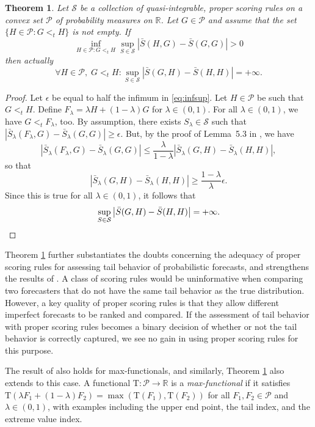 \documentclass[12pt]{article}
\newcommand{\R}{\mathbb{R}}
\newcommand{\Pp}{\mathcal{P}}
\newcommand{\Ss}{\mathcal{S}}
\newcommand{\1}{\mathbf{1}} %
\newtheorem{theorem}[propo]{Theorem}
\theoremstyle{definition}
\begin{document}
\begin{theorem}\label{thm:19}
Let $\Ss$ be a collection of quasi-integrable, proper scoring rules on a convex set $\Pp$ of probability measures on $\R$. Let $G \in \Pp$ and assume that the set $\{ H \in \Pp : G <_t H\}$ is not empty. If 
\begin{equation}
\label{eq:infsup}
	\inf_{H \in \Pp : G <_t H }
	\sup_{S \in \Ss} 
	\left| \bar{S}(H, G) - \bar{S}(G, G) \right| 
	> 0
\end{equation}
then actually
\[
	\forall H \in \Pp, \; G <_t H :
	\sup_{S \in \Ss} \left| \bar{S}(G, H) - \bar{S}(H, H) \right| = +\infty.
\]
\end{theorem}

\begin{proof}
Let $\epsilon$ be equal to half the infimum in \eqref{eq:infsup}.
Let $H \in \Pp$ be such that $G <_t H$. Define $F_\lambda = \lambda H + (1-\lambda) G$ for $\lambda \in (0, 1)$. For all $\lambda \in (0, 1)$, we have $G <_t F_\lambda$, too. By assumption, there exists $S_\lambda \in \Ss$ such that $\left| 
		\bar{S}_\lambda(F_\lambda, G) 
		- \bar{S}_\lambda(G, G) 
	\right|
	\ge \epsilon$.
But, by the proof of Lemma~5.3 in \citet{BrehmerStrokorb2019}, we have
\[
	\left| 
		\bar{S}_\lambda(F_\lambda, G) 
		- \bar{S}_\lambda(G, G) 
	\right|
	\le \frac{\lambda}{1-\lambda}
	\left| 
		\bar{S}_\lambda(G, H) - \bar{S}_\lambda(H, H) 
	\right|,
\]
so that
\[
	\left| \bar{S}_\lambda(G, H) - \bar{S}_\lambda(H, H) \right|
	\ge \frac{1-\lambda}{\lambda} \epsilon.
\]
Since this is true for all $\lambda \in (0, 1)$, it follows that
\[
	\sup_{S \in \Ss} \left| \bar{S}(G, H) - \bar{S}(H, H) \right| = +\infty.
	\qedhere
\]
\end{proof}

Theorem \ref{thm:19} further substantiates the doubts concerning the adequacy of proper scoring rules for assessing tail behavior of probabilistic forecasts, and strengthens the results of \cite{BrehmerStrokorb2019}. A class of scoring rules would be uninformative when comparing two forecasters that do not have the same tail behavior as the true distribution. However, a key quality of proper scoring rules is that they allow different imperfect forecasts to be ranked and compared. If the assessment of tail behavior with proper scoring rules becomes a binary decision of whether or not the tail behavior is correctly captured, we see no gain in using proper scoring rules for this purpose. 


The result of \citet{BrehmerStrokorb2019} also holds for max-functionals, and similarly, Theorem \ref{thm:19} also extends to this case. A functional $\mathrm{T} : \Pp \to \R$ is a \emph{max-functional} if it satisfies $\mathrm{T}(\lambda F_{1} + (1 - \lambda) F_{2}) = \max (\mathrm{T}(F_{1}), \mathrm{T}(F_{2}))$ for all $F_{1}, F_{2} \in \Pp$ and $\lambda \in (0, 1)$, with examples including the upper end point, the tail index, and the extreme value index. 
\end{document}
